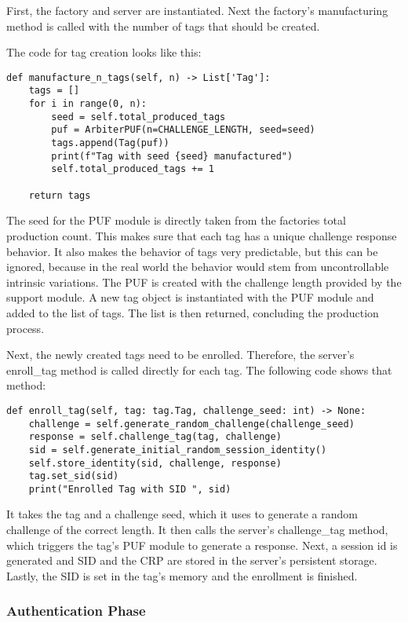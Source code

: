 First, the factory and server are instantiated.
Next the factory's manufacturing method is called with the number of tags that should be created.

The code for tag creation looks like this:

\begin{lstlisting}
def manufacture_n_tags(self, n) -> List['Tag']:
    tags = []
    for i in range(0, n):
        seed = self.total_produced_tags
        puf = ArbiterPUF(n=CHALLENGE_LENGTH, seed=seed)
        tags.append(Tag(puf))
        print(f"Tag with seed {seed} manufactured")
        self.total_produced_tags += 1

    return tags
\end{lstlisting}

The seed for the PUF module is directly taken from the factories total production count.
This makes sure that each tag has a unique challenge response behavior. It also makes the behavior
of tags very predictable, but this can be ignored, because in the real world the behavior
would stem from uncontrollable intrinsic variations.
The PUF is created with the challenge length provided by the support module.
A new tag object is instantiated with the PUF module and added to the list of tags.
The list is then returned, concluding the production process.

Next, the newly created tags need to be enrolled.
Therefore, the server's enroll\_tag method is called directly for each tag.
The following code shows that method:

\begin{lstlisting}
def enroll_tag(self, tag: tag.Tag, challenge_seed: int) -> None:
    challenge = self.generate_random_challenge(challenge_seed)
    response = self.challenge_tag(tag, challenge)
    sid = self.generate_initial_random_session_identity()
    self.store_identity(sid, challenge, response)
    tag.set_sid(sid)
    print("Enrolled Tag with SID ", sid)
\end{lstlisting}

It takes the tag and a challenge seed, which it uses to generate a random challenge of the correct length.
It then calls the server's challenge\_tag method, which triggers the tag's PUF module to generate a response.
Next, a session id is generated and SID and the CRP are stored in the server's persistent storage.
Lastly, the SID is set in the tag's memory and the enrollment is finished.

\subsubsection{Authentication Phase}


